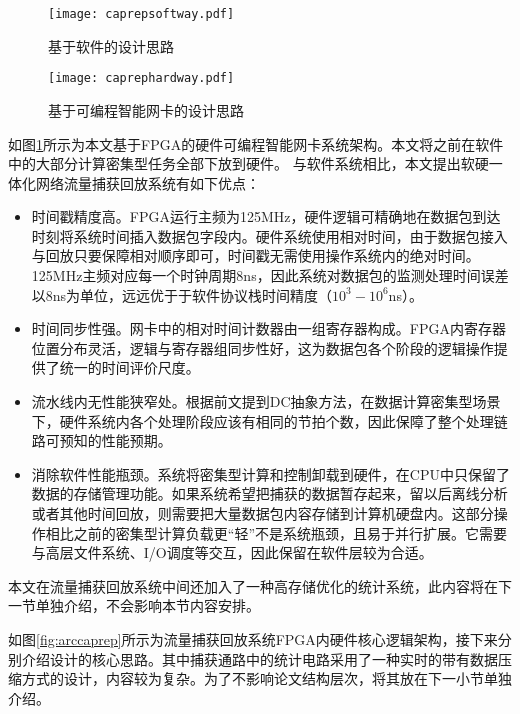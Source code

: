 \begin{figure}[htbp]
	\centering
	\begin{minipage}[t]{0.48\textwidth}
		\centering
		\texttt{[image: caprepsoftway.pdf]}
		\caption{基于软件的设计思路} \label{fig:caprepsoftway}
	\end{minipage}
	\begin{minipage}[t]{0.48\textwidth}
		\centering
		\texttt{[image: caprephardway.pdf]}
		\caption{基于可编程智能网卡的设计思路} \label{fig:caprephardway}
	\end{minipage}
\end{figure}

如图\ref{fig:caprephardway}所示为本文基于FPGA的硬件可编程智能网卡系统架构。本文将之前在软件中的大部分计算密集型任务全部下放到硬件。 与软件系统相比，本文提出软硬一体化网络流量捕获回放系统有如下优点：

\begin{itemize}
	\item 时间戳精度高。FPGA运行主频为125MHz，硬件逻辑可精确地在数据包到达时刻将系统时间插入数据包字段内。硬件系统使用相对时间，由于数据包接入与回放只要保障相对顺序即可，时间戳无需使用操作系统内的绝对时间。125MHz主频对应每一个时钟周期8ns，因此系统对数据包的监测处理时间误差以8ns为单位，远远优于于软件协议栈时间精度（$10^3-10^6$ns）。
	\item 时间同步性强。网卡中的相对时间计数器由一组寄存器构成。FPGA内寄存器位置分布灵活，逻辑与寄存器组同步性好，这为数据包各个阶段的逻辑操作提供了统一的时间评价尺度。
	\item 流水线内无性能狭窄处。根据前文提到DC抽象方法，在数据计算密集型场景下，硬件系统内各个处理阶段应该有相同的节拍个数，因此保障了整个处理链路可预知的性能预期。
	\item 消除软件性能瓶颈。系统将密集型计算和控制卸载到硬件，在CPU中只保留了数据的存储管理功能。如果系统希望把捕获的数据暂存起来，留以后离线分析或者其他时间回放，则需要把大量数据包内容存储到计算机硬盘内。这部分操作相比之前的密集型计算负载更“轻”不是系统瓶颈，且易于并行扩展。它需要与高层文件系统、I/O调度等交互，因此保留在软件层较为合适。
\end{itemize}

本文在流量捕获回放系统中间还加入了一种高存储优化的统计系统，此内容将在下一节单独介绍，不会影响本节内容安排。


如图\ref{fig:arccaprep}所示为流量捕获回放系统FPGA内硬件核心逻辑架构，接下来分别介绍设计的核心思路。其中捕获通路中的统计电路采用了一种实时的带有数据压缩方式的设计，内容较为复杂。为了不影响论文结构层次，将其放在下一小节单独介绍。

